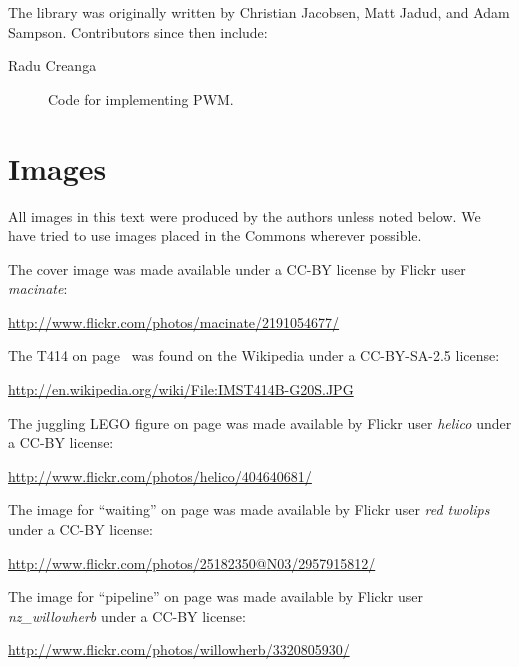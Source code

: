 The \plumbing library was originally written by Christian Jacobsen, Matt Jadud, and Adam Sampson. Contributors since then include:

\begin{description}
	\item[Radu Creanga] Code for implementing PWM.
\end{description}

\newpage

\section{Images}
All images in this text were produced by the authors unless noted below. We have tried to use images placed in the Commons wherever possible.

The cover image was made available under a CC-BY license by Flickr user {\em macinate}:

\small{\url{http://www.flickr.com/photos/macinate/2191054677/}}

The T414 on page~\pageref{image:t414} was found on the Wikipedia under a CC-BY-SA-2.5 license:

\small{\url{http://en.wikipedia.org/wiki/File:IMST414B-G20S.JPG}}

The juggling LEGO figure on page \pageref{image:juggling} was made available by Flickr user {\em helico} under a CC-BY license:

\small{\url{http://www.flickr.com/photos/helico/404640681/}}

The image for ``waiting'' on page \pageref{medio:waiting} was made available by Flickr user {\em red twolips} under a CC-BY license:

\small{\url{http://www.flickr.com/photos/25182350@N03/2957915812/}}

The image for ``pipeline'' on page \pageref{image:scotland-pipeline} was made available by Flickr user {\em nz\_willowherb} under a CC-BY license:

\small{\url{http://www.flickr.com/photos/willowherb/3320805930/}}

